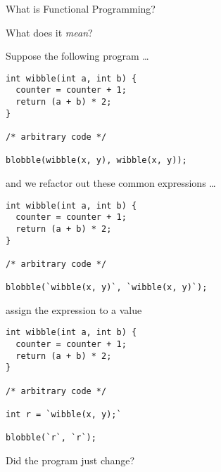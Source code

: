 \begin{frame}
\begin{center}
What is Functional Programming?
\end{center}
\begin{center}
What does it \emph{mean}?
\end{center}
\end{frame}

\begin{frame}[fragile]
\begin{block}{Suppose the following program \ldots}
\begin{lstlisting}[style=java]
int wibble(int a, int b) {
  counter = counter + 1;
  return (a + b) * 2;
}

/* arbitrary code */

blobble(wibble(x, y), wibble(x, y));
\end{lstlisting}
\end{block}
\end{frame}

\begin{frame}[fragile]
\begin{block}{and we refactor out these common expressions \ldots}
\begin{lstlisting}[style=java]
int wibble(int a, int b) {
  counter = counter + 1;
  return (a + b) * 2;
}

/* arbitrary code */

blobble(`wibble(x, y)`, `wibble(x, y)`);
\end{lstlisting}
\end{block}
\end{frame}

\begin{frame}[fragile]
\begin{block}{assign the expression to a value}
\begin{lstlisting}[style=java]
int wibble(int a, int b) {
  counter = counter + 1;
  return (a + b) * 2;
}

/* arbitrary code */

int r = `wibble(x, y);`

blobble(`r`, `r`);
\end{lstlisting}
\end{block}
\end{frame}

\begin{frame}[fragile]
\begin{center}
Did the program just change?
\end{center}
\end{frame}

